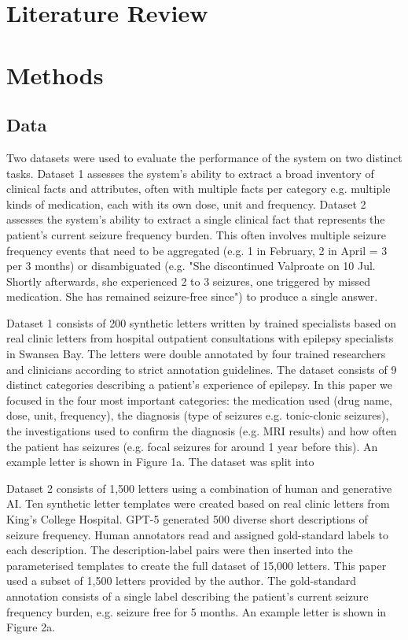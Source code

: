 \documentclass[conference]{IEEEtran}
\begin{document}
\section{Literature Review}

\section{Methods}
\subsection{Data}
Two datasets were used to evaluate the performance of the system on
two distinct tasks. Dataset 1 assesses the system's ability to extract a 
broad inventory of clinical facts and attributes, often with multiple facts 
per category e.g. multiple kinds of medication, each with its own dose, 
unit and frequency. Dataset 2 assesses the system's ability to extract
a single clinical fact that represents the patient's current seizure frequency
burden. This often involves multiple seizure frequency events that need to be
aggregated (e.g. 1 in February, 2 in April = 3 per 3 months) or disambiguated
(e.g. "She discontinued Valproate on 10 Jul. Shortly afterwards, she experienced
2 to 3 seizures, one triggered by missed medication. She has remained 
seizure-free since") to produce a single answer.

Dataset 1 consists of 200 synthetic letters written by
trained specialists based on real clinic letters from hospital outpatient
consultations with epilepsy specialists in Swansea Bay. The letters 
were double annotated by four trained researchers and clinicians
according to strict annotation guidelines. The dataset consists of 9
distinct categories describing a patient's experience of epilepsy. In this
paper we focused in the four most important categories: the medication
used (drug name, dose, unit, frequency), the diagnosis (type of seizures 
e.g. tonic-clonic seizures), the investigations used to confirm the diagnosis
(e.g. MRI results) and how often the patient has seizures (e.g. focal seizures
for around 1 year before this). An example letter is shown in Figure 1a. The 
dataset was split into 

Dataset 2 consists of 1,500 letters using a combination of 
human and generative AI. Ten synthetic letter templates were created 
based on real clinic letters from King's College Hospital. GPT-5 
generated 500 diverse short descriptions of seizure frequency. Human 
annotators read and assigned gold-standard labels to each 
description. The description-label pairs were then inserted into the 
parameterised templates to create the full dataset of 15,000 letters. This
paper used a subset of 1,500 letters provided by the author. The 
gold-standard annotation consists of a single label describing the patient's 
current seizure frequency burden, e.g. seizure free for 5 months. An example 
letter is shown in Figure 2a.
\end{document}
